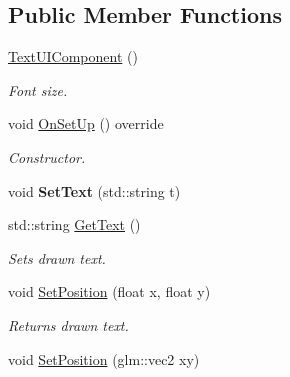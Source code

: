 \subsection*{Public Member Functions}
\begin{DoxyCompactItemize}
\item 
\hypertarget{class_text_u_i_component_a42895c18da48aeb5f68d5a1494315b62}{\hyperlink{class_text_u_i_component_a42895c18da48aeb5f68d5a1494315b62}{Text\+U\+I\+Component} ()}\label{class_text_u_i_component_a42895c18da48aeb5f68d5a1494315b62}

\begin{DoxyCompactList}\small\item\em Font size. \end{DoxyCompactList}\item 
void \hyperlink{class_text_u_i_component_a44791a353dbe82c4112f9f77fbaa27f2}{On\+Set\+Up} () override
\begin{DoxyCompactList}\small\item\em Constructor. \end{DoxyCompactList}\item 
\hypertarget{class_text_u_i_component_a4fa8c750a70ed097055af9bed210160e}{void {\bfseries Set\+Text} (std\+::string t)}\label{class_text_u_i_component_a4fa8c750a70ed097055af9bed210160e}

\item 
\hypertarget{class_text_u_i_component_a9374a6f35d7c970fef866c58fdc9d86f}{std\+::string \hyperlink{class_text_u_i_component_a9374a6f35d7c970fef866c58fdc9d86f}{Get\+Text} ()}\label{class_text_u_i_component_a9374a6f35d7c970fef866c58fdc9d86f}

\begin{DoxyCompactList}\small\item\em Sets drawn text. \end{DoxyCompactList}\item 
\hypertarget{class_text_u_i_component_a6b950479f75950657f2a694b95e637fa}{void \hyperlink{class_text_u_i_component_a6b950479f75950657f2a694b95e637fa}{Set\+Position} (float x, float y)}\label{class_text_u_i_component_a6b950479f75950657f2a694b95e637fa}

\begin{DoxyCompactList}\small\item\em Returns drawn text. \end{DoxyCompactList}\item 
\hypertarget{class_text_u_i_component_a69c924402ce18381aaf98e22b8ffe975}{void \hyperlink{class_text_u_i_component_a69c924402ce18381aaf98e22b8ffe975}{Set\+Position} (glm\+::vec2 xy)}\label{class_text_u_i_component_a69c924402ce18381aaf98e22b8ffe975}


\end{DoxyCompactItemize}

